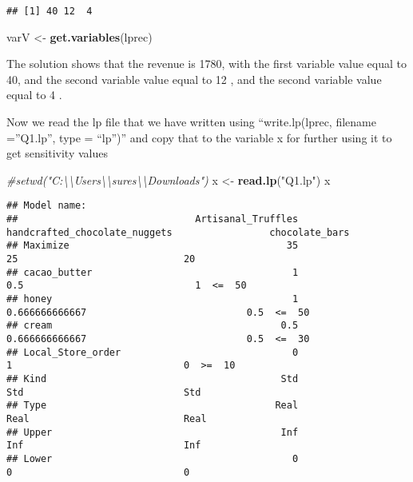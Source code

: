 \documentclass[
]{article}
\newenvironment{Shaded}{\begin{snugshade}}{\end{snugshade}}
\newcommand{\CommentTok}[1]{\textcolor[rgb]{0.56,0.35,0.01}{\textit{#1}}}
\newcommand{\FunctionTok}[1]{\textcolor[rgb]{0.13,0.29,0.53}{\textbf{#1}}}
\newcommand{\NormalTok}[1]{#1}
\newcommand{\OtherTok}[1]{\textcolor[rgb]{0.56,0.35,0.01}{#1}}
\newcommand{\StringTok}[1]{\textcolor[rgb]{0.31,0.60,0.02}{#1}}
\begin{document}
\begin{verbatim}
## [1] 40 12  4
\end{verbatim}

\begin{Shaded}
\begin{Highlighting}[]
\NormalTok{varV }\OtherTok{\textless{}{-}} \FunctionTok{get.variables}\NormalTok{(lprec)}
\end{Highlighting}
\end{Shaded}

The solution shows that the revenue is 1780, with the first variable
value equal to 40, and the second variable value equal to 12 , and the
second variable value equal to 4 .

Now we read the lp file that we have written using ``write.lp(lprec,
filename =''Q1.lp'', type = ``lp'')'' and copy that to the variable x
for further using it to get sensitivity values

\begin{Shaded}
\begin{Highlighting}[]
\CommentTok{\#setwd("C:\textbackslash{}\textbackslash{}Users\textbackslash{}\textbackslash{}sures\textbackslash{}\textbackslash{}Downloads")}
\NormalTok{x }\OtherTok{\textless{}{-}} \FunctionTok{read.lp}\NormalTok{(}\StringTok{"Q1.lp"}\NormalTok{)}
\NormalTok{x}
\end{Highlighting}
\end{Shaded}

\begin{verbatim}
## Model name: 
##                               Artisanal_Truffles  handcrafted_chocolate_nuggets                 chocolate_bars        
## Maximize                                      35                             25                             20        
## cacao_butter                                   1                            0.5                              1  <=  50
## honey                                          1                 0.666666666667                            0.5  <=  50
## cream                                        0.5                 0.666666666667                            0.5  <=  30
## Local_Store_order                              0                              1                              0  >=  10
## Kind                                         Std                            Std                            Std        
## Type                                        Real                           Real                           Real        
## Upper                                        Inf                            Inf                            Inf        
## Lower                                          0                              0                              0
\end{verbatim}
\end{document}
